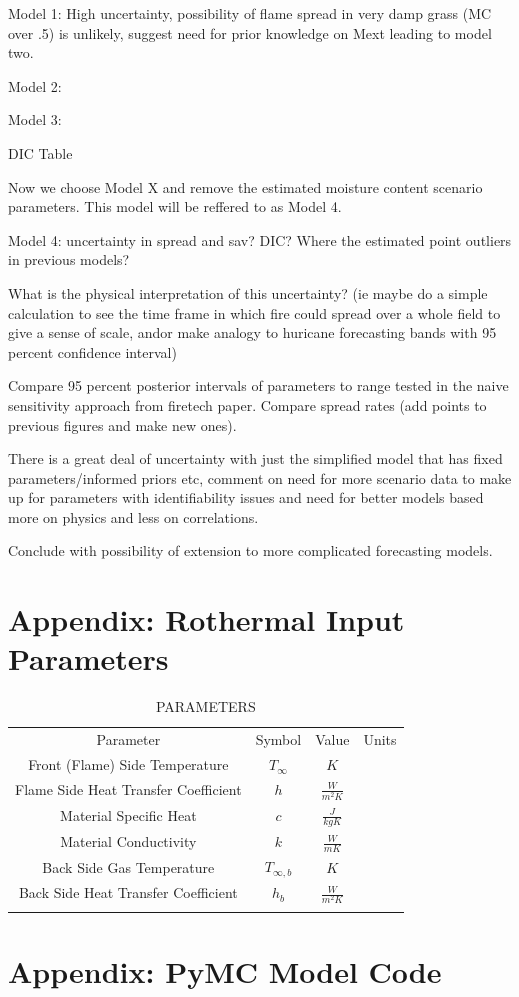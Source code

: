 \documentclass[11pt]{article}
\begin{document}
Model 1: High uncertainty, possibility of flame spread in very damp grass (MC over .5) is unlikely, suggest need for prior knowledge on Mext leading to model two.

Model 2:

Model 3:

DIC Table

Now we choose Model X and remove the estimated moisture content scenario parameters. This model will be reffered to as Model 4.

Model 4: uncertainty in spread and sav? DIC? Where the estimated point outliers in previous models?

What is the physical interpretation of this uncertainty? (ie maybe do a simple calculation to see the time frame in which fire could spread over a whole field to give a sense of scale, andor make analogy to huricane forecasting bands with 95 percent confidence interval) 

Compare 95 percent posterior intervals of parameters to range tested in the naive sensitivity approach from firetech paper. Compare spread rates (add points to previous figures and make new ones).

There is a great deal of uncertainty with just the simplified model that has fixed parameters/informed priors etc, comment on need for more scenario data to make up for parameters with identifiability issues and need for better models based more on physics and less on correlations.

Conclude with possibility of extension to more complicated forecasting models.

\clearpage
\appendix
\section{Appendix: Rothermal Input Parameters}
\label{ap:table}

\begin{table}[h]
\caption{PARAMETERS}
\begin{center}
  \begin{tabular}{cccc}
    \hline\noalign{\smallskip}
    Parameter & Symbol & Value & Units \\
    \noalign{\smallskip}\hline\noalign{\smallskip}
    Front (Flame) Side Temperature & $T_\infty$ & $K$\\
    Flame Side Heat Transfer Coefficient & $h$ & $\frac{W}{m^2K}$\\ 
    Material Specific Heat & $c$ & $\frac{J}{kgK}$\\ 
    Material Conductivity & $k$ & $\frac{W}{mK}$\\ 
    Back Side Gas Temperature & $T_{\infty,b}$ & $K$\\ 
    Back Side Heat Transfer Coefficient & $h_b$ & $\frac{W}{m^2K}$\\ 
    \noalign{\smallskip}\hline
  \end{tabular}
\end{center}
\label{tab:para}
\end{table}

\section{Appendix: PyMC Model Code}

% 
% 
\end{document}

